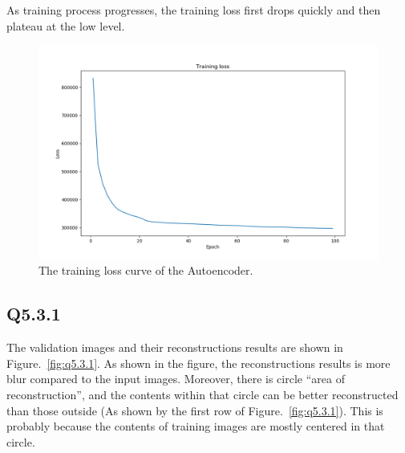 \documentclass[11pt]{article}
\begin{document}
As training process progresses, the training loss first drops quickly and then plateau at the low level.

\begin{figure}[h!]
    \centering
    \includegraphics[width=.8\linewidth]{../results/q5_2.png}
    \caption{The training loss curve of the Autoencoder. }
    \label{fig:q5.2}
\end{figure}

\newpage

\subsection*{Q5.3.1}

The validation images and their reconstructions results are shown in Figure.~\ref{fig:q5.3.1}. As shown in the figure, the reconstructions results is more blur compared to the input images. Moreover, there is circle ``area of reconstruction'', and the contents within that circle can be better reconstructed than those outside (As shown by the first row of Figure.~\ref{fig:q5.3.1}). This is probably because the contents of training images are mostly centered in that circle.
\end{document}
